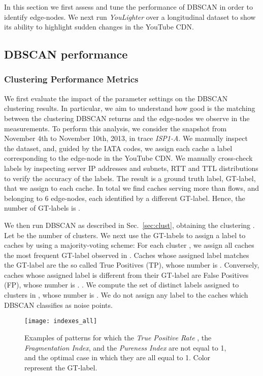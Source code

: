 \documentclass{acm_proc_article-sp}
\newcommand{\tool}{\textit{YouLighter}\xspace}
\newcommand{\node}{{edge-node}\xspace}
\newcommand{\nodes}{{edge-nodes}\xspace}
\newcommand{\TApub}{\textit{ISP1-A}\xspace}
\begin{document}
In this section we first assess and tune the performance of DBSCAN in order to identify \nodes.
We next run \tool over a longitudinal dataset to show its ability to highlight sudden changes in the YouTube CDN.

\subsection{DBSCAN performance}
\subsubsection{Clustering Performance Metrics}
We first evaluate the impact of the parameter settings on the DBSCAN clustering results. In particular, we aim to understand how good is the matching between the clustering DBSCAN returns and the \nodes we observe in the measurements. To perform this analysis, we consider the snapshot  from November 4th to November 10th, 2013, in trace \TApub. We manually inspect the dataset, and, guided by the IATA codes, we assign each cache a label corresponding to the \node in the YouTube CDN. We manually cross-check labels by inspecting server IP addresses and subnets, RTT and TTL distributions to verify the accuracy of the labels. The result is a ground truth label, GT-label, that we assign to each cache.
In total we find  caches serving more than  flows, and belonging to 6 \nodes, each identified by a different GT-label. Hence, the number of GT-labels is .

We then run DBSCAN as described in Sec.~\ref{sec:clust}, obtaining the clustering .
Let  be the number of clusters. We next use the GT-labels to assign a label
to caches by using a majority-voting scheme: For each cluster , we assign all caches  the most frequent GT-label observed in .
Caches whose assigned label matches the GT-label are the so called True Positives (TP), whose number is . Conversely, caches whose assigned label is different from their GT-label are False Positives (FP), whose number is . .
We compute the set of distinct labels assigned to clusters in , whose number is .
We do not assign any label to the caches which DBSCAN classifies as noise points.



\begin{figure}[t!]
\begin{center}
 \texttt{[image: indexes\_all]}
 \caption{Examples of patterns for which the \textit{True Positive Rate} , the \textit{Fragmentation Index}, and the \textit{Pureness Index} are not equal to 1, and the optimal case in which they are all equal to 1. Color represent the GT-label.}
  \label{fig:indexes}
\end{center}
\end{figure}
\end{document}
